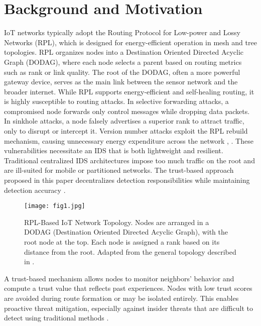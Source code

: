 \documentclass[final,5p,times,twocolumn]{elsarticle}
\begin{document}
\section{Background and Motivation}
IoT networks typically adopt the Routing Protocol for Low-power and Lossy Networks (RPL), which is designed for energy-efficient operation in mesh and tree topologies. RPL organizes nodes into a Destination Oriented Directed Acyclic Graph (DODAG), where each node selects a parent based on routing metrics such as rank or link quality. The root of the DODAG, often a more powerful gateway device, serves as the main link between the sensor network and the broader internet.
While RPL supports energy-efficient and self-healing routing, it is highly susceptible to routing attacks. In selective forwarding attacks, a compromised node forwards only control messages while dropping data packets. In sinkhole attacks, a node falsely advertises a superior rank to attract traffic, only to disrupt or intercept it. Version number attacks exploit the RPL rebuild mechanism, causing unnecessary energy expenditure across the network \cite{Medjek2017}, \cite{Ioulianou2022}.
These vulnerabilities necessitate an IDS that is both lightweight and resilient. Traditional centralized IDS architectures impose too much traffic on the root and are ill-suited for mobile or partitioned networks. The trust-based approach proposed in this paper decentralizes detection responsibilities while maintaining detection accuracy \cite{Khan2017}.

\begin{figure}[htbp]
    \centering
    \texttt{[image: fig1.jpg]} %
    \caption{RPL-Based IoT Network Topology. Nodes are arranged in a DODAG (Destination Oriented Directed Acyclic Graph), with the root node at the top. Each node is assigned a rank based on its distance from the root. Adapted from the general topology described in \cite{Khan2017}.}
    \label{fig:rpl_topology}
\end{figure}

A trust-based mechanism allows nodes to monitor neighbors’ behavior and compute a trust value that reflects past experiences. Nodes with low trust scores are avoided during route formation or may be isolated entirely. This enables proactive threat mitigation, especially against insider threats that are difficult to detect using traditional methods \cite{Ioulianou2022}.
\end{document}
